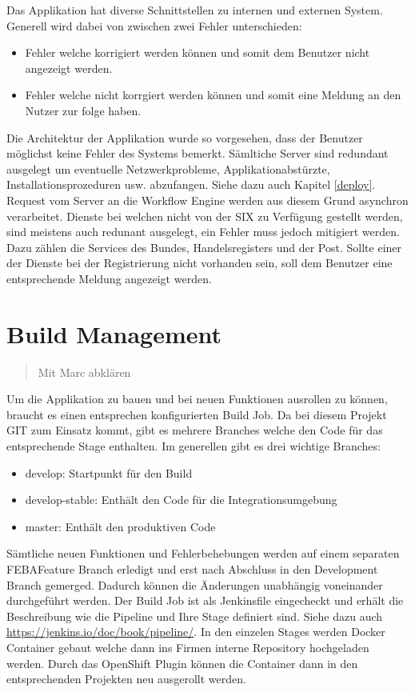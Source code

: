 Das Applikation hat diverse Schnittstellen zu internen und externen System. Generell wird dabei von zwischen zwei Fehler unterschieden:
\begin{itemize}
	\item Fehler welche korrigiert werden können und somit dem Benutzer nicht angezeigt werden.
	\item Fehler welche nicht korrgiert werden können und somit eine Meldung an den Nutzer zur folge haben.
\end{itemize}
Die Architektur der Applikation wurde so vorgesehen, dass der Benutzer möglichst keine Fehler des Systems bemerkt. Sämltiche Server sind redundant ausgelegt um eventuelle Netzwerkprobleme, Applikationabstürzte, Installationsprozeduren usw. abzufangen. Siehe dazu auch Kapitel \ref{deploy}. Request vom Server an die Workflow Engine werden aus diesem Grund asynchron verarbeitet.\newline
Dienste bei welchen nicht von der SIX zu Verfügung gestellt werden, sind meistens auch redunant ausgelegt, ein Fehler muss jedoch mitigiert werden. Dazu zählen die Services des Bundes, Handelsregisters und der Post. Sollte einer der Dienste bei der Registrierung nicht vorhanden sein, soll dem Benutzer eine entsprechende Meldung angezeigt werden.

\section{Build Management}
\begin{quote}
 Mit Marc abklären
\end{quote}

Um die Applikation zu bauen und bei neuen Funktionen ausrollen zu können, braucht es einen entsprechen konfigurierten Build Job. Da bei diesem Projekt GIT zum Einsatz kommt, gibt es mehrere Branches welche den Code für das entsprechende Stage enthalten. Im generellen gibt es drei wichtige Branches:
\begin{itemize}
	\item develop: Startpunkt für den Build
	\item develop-stable: Enthält den Code für die Integrationsumgebung
	\item master: Enthält den produktiven Code
\end{itemize}
Sämtliche neuen Funktionen und Fehlerbehebungen werden auf einem separaten \Gls{FEBA}Feature Branch erledigt und erst nach Abschluss in den Development Branch gemerged. Dadurch können die Änderungen unabhängig voneinander durchgeführt werden.\newline
Der Build Job ist als Jenkinsfile eingecheckt und erhält die Beschreibung wie die Pipeline und Ihre Stage definiert sind. Siehe dazu auch \url{https://jenkins.io/doc/book/pipeline/}. In den einzelen Stages werden Docker Container gebaut welche dann ins Firmen interne Repository hochgeladen werden. Durch das OpenShift Plugin können die Container dann in den entsprechenden Projekten neu ausgerollt werden.

